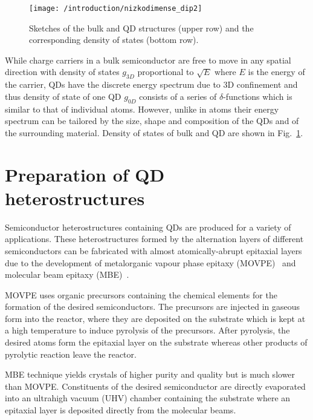 \documentclass[
a4paper, %
11pt, %
onecolumn, %
openany, %
oldfontcommands,
]{memoir}
\begin{document}
%
\begin{figure}
	\centering
	\texttt{[image: /introduction/nizkodimense\_dip2]}
	\caption{Sketches of the bulk and QD structures (upper row) and the corresponding density of states (bottom row).}
	\label{fig:intr:nizkodimenze}
\end{figure}
%
While charge carriers in a bulk semiconductor are free to move in any spatial direction with density of states $g_{3D}$ proportional to $\sqrt{E}$ where $E$ is the energy of the carrier, QDs have the discrete energy spectrum due to 3D confinement and thus density of state of one QD $g_{0D}$ consists of a series of $\delta$-functions which is similar to that of individual atoms. However, unlike in atoms their energy spectrum can be tailored by the size, shape and composition of the QDs and of the surrounding material. Density of states of bulk and QD are shown in Fig.~\ref{fig:intr:nizkodimenze}.

\section{Preparation of QD heterostructures}
Semiconductor heterostructures containing QDs are produced for a variety of applications. These heterostructures formed by the alternation layers of different semiconductors can be fabricated with almost atomically-abrupt epitaxial layers due to the development of metalorganic vapour phase epitaxy (MOVPE)~\cite{Stringfellow,MOVPE_May} and molecular beam epitaxy (MBE)~\cite{Stringfellow,MOVPE_May}.

MOVPE uses organic precursors containing the chemical elements for the formation of the desired semiconductors. The precursors are injected in gaseous form into the reactor, where they are deposited on the substrate which is kept at a high temperature to induce pyrolysis of the precursors. After pyrolysis, the desired atoms form the epitaxial layer on the substrate whereas other products of pyrolytic reaction leave the reactor.



MBE technique yields crystals of higher purity and quality but is much slower than MOVPE. Constituents of the desired semiconductor are directly evaporated into an ultrahigh vacuum (UHV) chamber containing the substrate where an epitaxial layer is deposited directly from the molecular beams.
\end{document}
